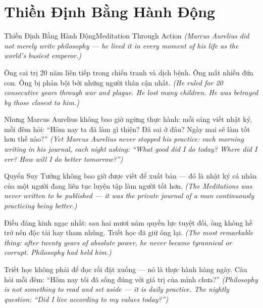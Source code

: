 \section{Thiền Định Bằng Hành Động}
\begin{truyen}{Thiền Định Bằng Hành Động}{Meditation Through Action}
\textit{(Marcus Aurelius did not merely write philosophy — he lived it in every moment of his life as the world's busiest emperor.)}

Ông cai trị 20 năm liên tiếp trong chiến tranh và dịch bệnh. Ông mất nhiều đứa con. Ông bị phản bội bởi những người thân cận nhất.
\textit{(He ruled for 20 consecutive years through war and plague. He lost many children. He was betrayed by those closest to him.)}

Nhưng Marcus Aurelius không bao giờ ngừng thực hành: mỗi sáng viết nhật ký, mỗi đêm hỏi: ``Hôm nay ta đã làm gì thiện? Đã sai ở đâu? Ngày mai sẽ làm tốt hơn thế nào?''
\textit{(Yet Marcus Aurelius never stopped his practice: each morning writing in his journal, each night asking: ``What good did I do today? Where did I err? How will I do better tomorrow?'')}

Quyển Suy Tưởng không bao giờ được viết để xuất bản — đó là nhật ký cá nhân của một người đang liên tục luyện tập làm người tốt hơn.
\textit{(The Meditations was never written to be published — it was the private journal of a man continuously practicing being better.)}

Điều đáng kinh ngạc nhất: sau hai mươi năm quyền lực tuyệt đối, ông không hề trở nên độc tài hay tham nhũng. Triết học đã giữ ông lại.
\textit{(The most remarkable thing: after twenty years of absolute power, he never became tyrannical or corrupt. Philosophy had held him.)}

\end{truyen}

\begin{baihoc}
Triết học không phải để đọc rồi đặt xuống — nó là thực hành hàng ngày. Câu hỏi mỗi đêm: ``Hôm nay tôi đã sống đúng với giá trị của mình chưa?''
\textit{(Philosophy is not something to read and set aside — it is daily practice. The nightly question: ``Did I live according to my values today?'')}
\end{baihoc}
\ngancach

